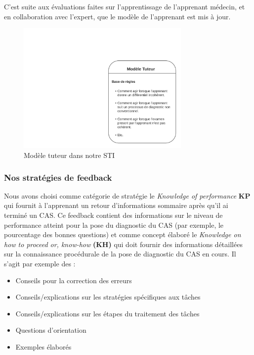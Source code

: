 C'est suite aux évaluations faites sur l'apprentissage de l'apprenant médecin, et en collaboration avec l'expert, que le modèle de l'apprenant est mis à jour.
 \newpage
 
\begin{figure}
    \includegraphics[width=0.75\textwidth]{figures/mod_tuteur.png}
    \captionsetup{justification=centering}
    \caption{Modèle tuteur dans notre STI}
 \label{fig:2}
\end{figure}

\subsubsection{Nos stratégies de feedback}

Nous avons choisi comme catégorie de stratégie le \textit{Knowledge of performance} \textbf{KP} qui fournit à l'apprenant un retour d'informations sommaire après qu'il ai terminé un CAS. Ce feedback contient des informations sur le niveau de performance atteint pour la pose du diagnostic du CAS (par exemple, le pourcentage des bonnes questions) et comme concept élaboré le \textit{Knowledge on how to proceed or, know-how} \textbf{(KH)} \cite{narciss2008feedback} qui doit fournir des informations détaillées sur la connaissance procédurale de la pose de diagnostic du CAS en cours. Il s'agit par exemple des :
\begin{itemize}
    \item Conseils pour la correction des erreurs 
    \item Conseils/explications sur les stratégies spécifiques aux tâches
    \item Conseils/explications sur les étapes du traitement des tâches
    \item Questions d'orientation
    \item Exemples élaborés
\end{itemize}

